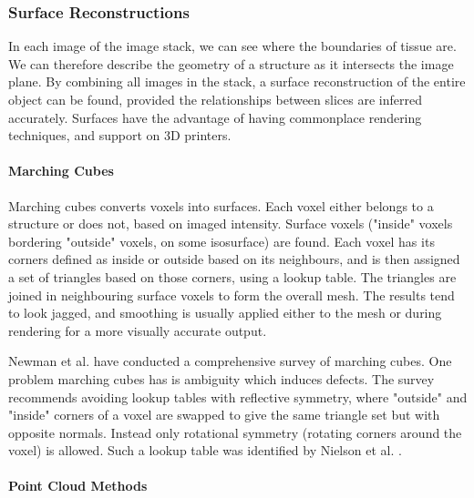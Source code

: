 \documentclass[11p, titlepage]{article}
\begin{document}
\subsubsection{Surface Reconstructions}

In each image of the image stack, we can see where the boundaries of tissue are. We can therefore describe the geometry of a structure as it intersects the image plane. By combining all images in the stack, a surface reconstruction of the entire object can be found, provided the relationships between slices are inferred accurately. Surfaces have the advantage of having commonplace rendering techniques, and support on 3D printers.

\paragraph{Marching Cubes}

Marching cubes \cite{lorensen1987marching} converts voxels into surfaces. Each voxel either belongs to a structure or does not, based on imaged intensity. Surface voxels ("inside" voxels bordering "outside" voxels, on some isosurface) are found. Each voxel has its corners defined as inside or outside based on its neighbours, and is then assigned a set of triangles based on those corners, using a lookup table. The triangles are joined in neighbouring surface voxels to form the overall mesh. The results tend to look jagged, and smoothing is usually applied either to the mesh or during rendering for a more visually accurate output.

Newman et al. \cite{newman2006survey} have conducted a comprehensive survey of marching cubes. One problem marching cubes has is ambiguity which induces defects. The survey recommends avoiding lookup tables with reflective symmetry, where "outside" and "inside" corners of a voxel are swapped to give the same triangle set but with opposite normals. Instead only rotational symmetry (rotating corners around the voxel) is allowed. Such a lookup table was identified by Nielson et al. \cite{nielson2003marching}.

\paragraph{Point Cloud Methods}
\end{document}
